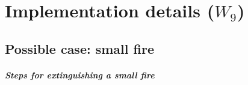 \documentclass[a4paper,12pt]{report}
\begin{document}







\chapter{Implementation details ($W_9$)}

\section{Possible case: small fire}

\paragraph{\it Steps for extinguishing a small fire}$$
\end{document}
